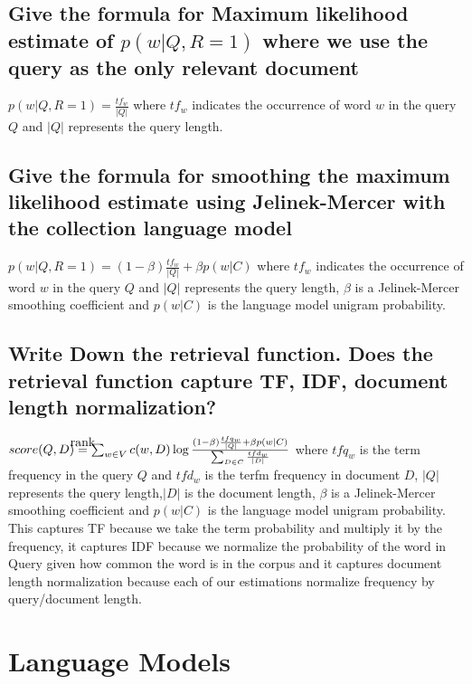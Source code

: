 \documentclass[11pt]{article}
\newcommand\myeq{\stackrel{\mathclap{\normalfont\mbox{rank}}}{=}}
\begin{document}
\subsection{Give the formula for Maximum likelihood estimate of $p(w | Q, R= 1)$ where we use the query as the only relevant document}
$p(w | Q, R=1) = \frac{tf_w}{|Q|}$ where $tf_w$ indicates the occurrence of word $w$ in the query $Q$ and $|Q|$ represents the query length.
\subsection{Give the formula for smoothing the maximum likelihood estimate using Jelinek-Mercer with the collection language model}
$p(w | Q, R=1) = (1- \beta) \frac{tf_w}{|Q|}+ \beta p(w|C)$ where $tf_w$ indicates the occurrence of word $w$ in the query $Q$ and $|Q|$ represents the query length, $\beta$ is a Jelinek-Mercer smoothing coefficient and $p(w|C)$ is the language model unigram probability.
\subsection{Write Down the retrieval function. Does the retrieval function capture TF, IDF, document length normalization?}
$score(Q,D) \myeq  \sum_{w \in V} c(w,D) \log \frac{(1- \beta) \frac{tfq_w}{|Q|}+ \beta p(w|C)}{\sum_{D \in C} \frac{tfd_w}{|D|}} $ where $tfq_w$ is the term frequency in the query $Q$ and $tfd_w$ is the terfm frequency in document $D$, $|Q|$ represents the query length,$|D|$ is the document length, $\beta$ is a Jelinek-Mercer smoothing coefficient and $p(w|C)$ is the language model unigram probability. \\
This captures TF because we take the term probability and multiply it by the frequency, it captures IDF because we normalize the probability of the word in Query given how common the word is in the corpus and it captures document length normalization because each of our estimations normalize frequency by query/document length.
\section{Language Models}
\end{document}
